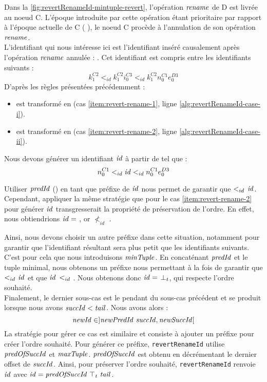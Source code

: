 Dans la \autoref{fig:revertRenameId-mintuple-revert}, l'opération $\mathit{rename}$ de D est livrée au noeud C.
L'époque introduite par cette opération étant prioritaire par rapport à l'époque actuelle de C ( \lepoch {}), le noeud C procède à l'annulation de son opération $\mathit{rename}$.\\

L'identifiant qui nous intéresse ici est l'identifiant inséré causalement après l'opération $\mathit{rename}$ annulée : .
Cet identifiant est compris entre les identifiants suivants :
\[k^{C2}_{1} <_{id} k^{C2}_{1}i^{C3}_{0} <_{id} k^{C2}_{1}n^{C1}_{0}e^{D3}_{0}\]
D'après les règles présentées précédemment :
\begin{itemize}
  \item {} est transformé en  (cas \ref{item:revert-rename-1}, ligne \ref{alg:revertRenameId-case-i}).
  \item {} est transformé en  (cas \ref{item:revert-rename-2}, ligne \ref{alg:revertRenameId-case-ii}).
\end{itemize}
Nous devons générer un identifiant $\mathit{id}$ à partir de  tel que :
\[n^{C1}_{0} <_{id} \mathit{id} <_{id} n^{C1}_{0}e^{D3}_{0}\]

Utiliser $\mathit{predId}$ () en tant que préfixe de $\mathit{id}$ nous permet de garantir que  $<_{id}$ $\mathit{id}$.
Cependant, appliquer la même stratégie que pour le cas \ref{item:revert-rename-2} pour générer $\mathit{id}$ transgresserait la propriété de préservation de l'ordre.
En effet, nous obtiendrions $\mathit{id} = $ , or  $\nless_{id}$ .

Ainsi, nous devons choisir un autre préfixe dans cette situation, notamment pour garantir que l'identifiant résultant sera plus petit que les identifiants suivants.
C'est pour cela que nous introduisons $\mathit{minTuple}$.
En concaténant $\mathit{predId}$ et le tuple minimal, nous obtenons un préfixe nous permettant à la fois de garantir que  $<_{id}$ $\mathit{id}$ et que $\mathit{id}$ $<_{id}$ .
Nous obtenons donc $\mathit{id} = $ $\bot_t$, qui respecte l'ordre souhaité.\\

Finalement, le dernier sous-cas est le pendant du sous-cas précédent et se produit lorsque nous avons $\mathit{succId} < \mathit{tail}$.
Nous avons alors :
\[\mathit{newId} \in ]\mathit{newPredId~succId}, \mathit{newSuccId}[\]
La stratégie pour gérer ce cas est similaire et consiste à ajouter un préfixe pour créer l'ordre souhaité.
Pour générer ce préfixe, \texttt{revertRenameId} utilise  $\mathit{predOfSuccId}$ et $\mathit{maxTuple}$.
$\mathit{predOfSuccId}$ est obtenu en décrémentant le dernier offset de $\mathit{succId}$.
Ainsi, pour préserver l'ordre souhaité, \texttt{revertRenameId} renvoie $\mathit{id}$ avec $\mathit{id} = \mathit{predOfSuccId~\top_t~tail}$.

